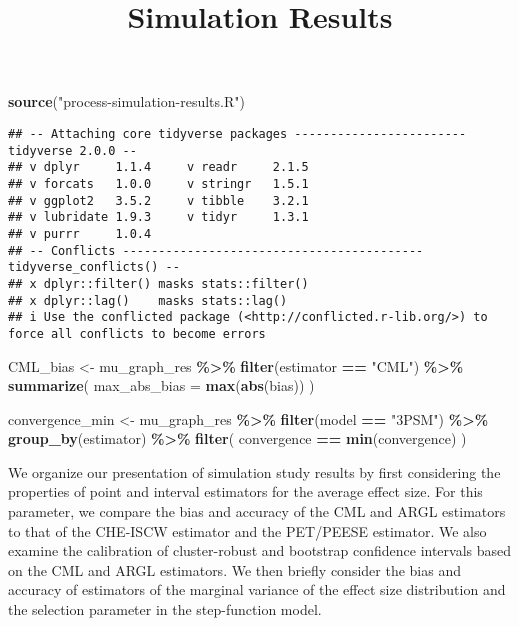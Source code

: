 \documentclass[
]{article}
\title{Simulation Results}
\author{}
\date{\vspace{-2.5em}}
\newenvironment{Shaded}{\begin{snugshade}}{\end{snugshade}}
\newcommand{\AttributeTok}[1]{\textcolor[rgb]{0.13,0.29,0.53}{#1}}
\newcommand{\FunctionTok}[1]{\textcolor[rgb]{0.13,0.29,0.53}{\textbf{#1}}}
\newcommand{\NormalTok}[1]{#1}
\newcommand{\OtherTok}[1]{\textcolor[rgb]{0.56,0.35,0.01}{#1}}
\newcommand{\SpecialCharTok}[1]{\textcolor[rgb]{0.81,0.36,0.00}{\textbf{#1}}}
\newcommand{\StringTok}[1]{\textcolor[rgb]{0.31,0.60,0.02}{#1}}
\begin{document}
\maketitle

\begin{Shaded}
\begin{Highlighting}[]
\FunctionTok{source}\NormalTok{(}\StringTok{"process{-}simulation{-}results.R"}\NormalTok{)}
\end{Highlighting}
\end{Shaded}

\begin{verbatim}
## -- Attaching core tidyverse packages ------------------------ tidyverse 2.0.0 --
## v dplyr     1.1.4     v readr     2.1.5
## v forcats   1.0.0     v stringr   1.5.1
## v ggplot2   3.5.2     v tibble    3.2.1
## v lubridate 1.9.3     v tidyr     1.3.1
## v purrr     1.0.4     
## -- Conflicts ------------------------------------------ tidyverse_conflicts() --
## x dplyr::filter() masks stats::filter()
## x dplyr::lag()    masks stats::lag()
## i Use the conflicted package (<http://conflicted.r-lib.org/>) to force all conflicts to become errors
\end{verbatim}

\begin{Shaded}
\begin{Highlighting}[]
\NormalTok{CML\_bias }\OtherTok{\textless{}{-}} 
\NormalTok{  mu\_graph\_res }\SpecialCharTok{\%\textgreater{}\%}
  \FunctionTok{filter}\NormalTok{(estimator }\SpecialCharTok{==} \StringTok{"CML"}\NormalTok{) }\SpecialCharTok{\%\textgreater{}\%}
  \FunctionTok{summarize}\NormalTok{(}
    \AttributeTok{max\_abs\_bias =} \FunctionTok{max}\NormalTok{(}\FunctionTok{abs}\NormalTok{(bias))}
\NormalTok{  )}

\NormalTok{convergence\_min }\OtherTok{\textless{}{-}} 
\NormalTok{  mu\_graph\_res }\SpecialCharTok{\%\textgreater{}\%}
  \FunctionTok{filter}\NormalTok{(model }\SpecialCharTok{==} \StringTok{"3PSM"}\NormalTok{) }\SpecialCharTok{\%\textgreater{}\%}
  \FunctionTok{group\_by}\NormalTok{(estimator) }\SpecialCharTok{\%\textgreater{}\%}
  \FunctionTok{filter}\NormalTok{(}
\NormalTok{    convergence }\SpecialCharTok{==} \FunctionTok{min}\NormalTok{(convergence)}
\NormalTok{  )}
\end{Highlighting}
\end{Shaded}

We organize our presentation of simulation study results by first
considering the properties of point and interval estimators for the
average effect size. For this parameter, we compare the bias and
accuracy of the CML and ARGL estimators to that of the CHE-ISCW
estimator and the PET/PEESE estimator. We also examine the calibration
of cluster-robust and bootstrap confidence intervals based on the CML
and ARGL estimators. We then briefly consider the bias and accuracy of
estimators of the marginal variance of the effect size distribution and
the selection parameter in the step-function model.
\end{document}
